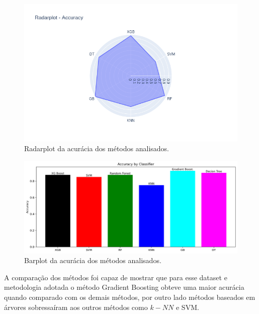 \documentclass[
	article,			%
	11pt,				%
	oneside,			%
	a4paper,			%
	english,			%
	brazil,				%
	sumario=tradicional
	]{abntex2}
\begin{document}
\begin{figure}[H]
 \centering
 \includegraphics[scale=0.5]{fig/radarplot.png}
 \caption{Radarplot da acurácia dos métodos analisados.}
 \label{fig:radar}
\end{figure}

\begin{figure}[H]
 \centering
 \includegraphics[scale=0.4]{fig/barplot.png}
 \caption{Barplot da acurácia dos métodos analisados.}
 \label{fig:barplot}
\end{figure}

A comparação dos métodos foi capaz de mostrar que para esse dataset e metodologia adotada o método Gradient Boosting obteve uma maior acurácia quando comparado com os demais métodos, por outro lado métodos baseados em árvores sobressaíram aos outros métodos como $k-NN$ e SVM.  

\postextual
\end{document}
